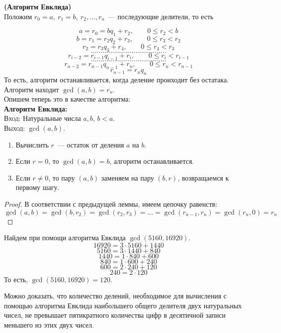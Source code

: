 \documentclass[11pt]{article}
\begin{document}
	\begin{theorem}\textbf{(Алгоритм Евклида)}\\
		Положим $r_0 = a, \ r_1 = b, \ r_2, \ldots, r_n$~--- последующие делители, то есть

		\[	a = r_0 = b q_1 + r_2, \qquad 0 \le r_2 < b  \]
		\[	b = r_1 = r_2 q_2 + r_3, \qquad 0 \le r_3 < r_2 \]
		\[	r_2 = r_3 q_3 + r_4, \qquad 0 \le r_4 < r_3 \]
		\[	\ldots \ldots \ldots \ldots \ldots \ldots \ldots \ldots \ldots \ldots \ldots \ldots \ldots  \]
		\[	r_{i - 2} = r_{i - 1} q_{i - 1} + r_{i}, \qquad 0 \le r_{i} < r_{i - 1} \]
		\[	\ldots \ldots \ldots \ldots \ldots \ldots \ldots \ldots \ldots \ldots \ldots \ldots \ldots \]
		\[	r_{n - 2} = r_{n - 1} q_{n - 1} + r_{n}, \qquad 0 \le r_n < r_{n - 1} \]
		\[	r_{n - 1} = r_n q_{n} \]
	То есть, алгоритм останавливается, когда деление проиходит без остатака. Алгоритм находит $\gcd(a, b) = r_n$.\\
	Опишем теперь это в качестве алгоритма:\\
	\textbf{Алгоритм Евклида:}\\
	\textsc{Вход:} Натуральные числа $a, b$, $b < a$.\\
	\textsc{Выход:} $\gcd(a, b)$.
	\begin{enumerate}

		\item Вычислить $r$~--- остаток  от деления $a$ на $b$.

		\item Если $r = 0$, то $\gcd(a, b) = b$, алгоритм останавливается.

		\item Если $r \neq 0$, то пару $(a, b)$ заменяем на пару $(b, r)$, возвращаемся к первому шагу.

	\end{enumerate}
	\end{theorem}
	\begin{proof}
	    В соответствии с предыдущей леммы, имеем цепочку равенств:
		\[ \gcd(a, b) = \gcd(b, r_2) = \gcd(r_2, r_3) = \ldots = \gcd(r_{n - 1}, r_n) = \gcd(r_n, 0) = r_n \]
	\end{proof}
	\begin{example} Найдем при помощи алгоритма Евклида $\gcd(5160, 16920)$.
	\[ 16920 = 3 \cdot 5160 + 1440 \]
	\[ 5160 = 3 \cdot 1440 + 840 \]
	\[ 1440 = 1 \cdot 840 + 600 \]
	\[ 840 = 1 \cdot 600 + 240 \]
	\[ 600 = 2 \cdot 240 + 120 \]
	\[ 240 = 2 \cdot 120 \]
	То есть, $\gcd(5160, 16920) = 120$.
	\end{example}
	\begin{remark}
	    Можно доказать, что количество делений, необходимое для вычисления с помощью алгоритма Евклида наибольшего
		общего делителя двух натуральных чисел, не превышает пятикратного количества цифр в десятичной записи меньшего из
		этих двух чисел.
	\end{remark}
\end{document}
